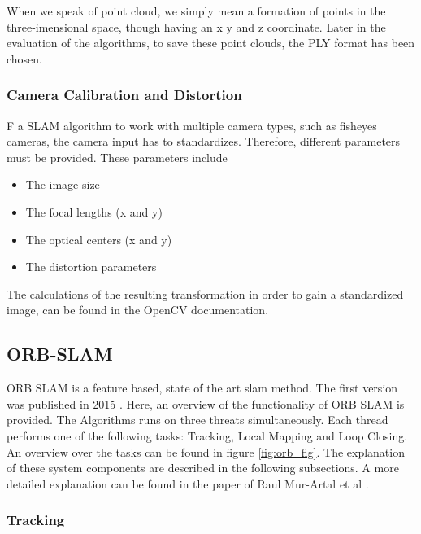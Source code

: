 		When we speak of point cloud, we simply mean a formation of points in the three-imensional space, though having
		an x y and z coordinate. Later in the evaluation of the algorithms, to save these point clouds, the PLY format has 
		been chosen. 
		
		\subsubsection{Camera Calibration and Distortion} \label{camcalib}
		
		F a SLAM algorithm to work with multiple camera types, such as fisheyes cameras, the camera input has to standardizes. Therefore, different 
		parameters must be provided. These parameters include 
		
		\begin{itemize}
		\item{The image size}
		\item{The focal lengths (x and y)}
		\item{The optical centers (x and y)}
		\item{The distortion parameters}
		\end{itemize}
		
		The calculations of the resulting transformation in order to gain a standardized image, can be found in the OpenCV documentation. 

	\subsection{ORB-SLAM}\label{orbcomp}
	
	ORB SLAM is a feature based, state of the art slam method. The first version was published in 2015 \cite{orb}. 
	Here, an overview of the functionality of ORB SLAM is provided. The Algorithms runs on three threats simultaneously.
	Each thread performs one of the following tasks: Tracking, Local Mapping and Loop Closing. An overview over the tasks can be found 
	in figure \ref{fig:orb_fig}. The explanation of these system components are described in the following subsections. 
	A more detailed explanation can be found in the paper of Raul Mur-Artal et al \cite{orb}.
	
	
	\subsubsection{Tracking}
	
